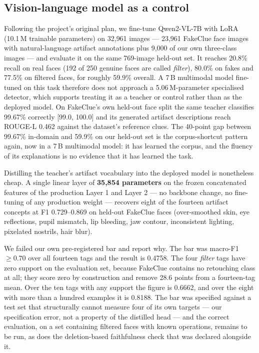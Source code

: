 \documentclass[conference]{IEEEtran}
\begin{document}
\subsection{Vision-language model as a control}
\label{sec:vlm}
Following the project's original plan, we fine-tune Qwen2-VL-7B with LoRA
(10.1\,M trainable parameters) on 32{,}961 images --- 23{,}961 FakeClue face images with
natural-language artifact annotations plus 9{,}000 of our own three-class images --- and
evaluate it on the same 769-image held-out set. It reaches 20.8\% recall on real faces
(192 of 250 genuine faces are called \emph{filter}), 80.0\% on fakes and 77.5\% on filtered
faces, for roughly 59.9\% overall. A 7\,B multimodal model fine-tuned on this task therefore
does not approach a 5.06\,M-parameter specialised detector, which supports treating it as a
teacher or control rather than as the deployed model.
On FakeClue's own held-out face split the same teacher classifies 99.67\% correctly
[99.0, 100.0] and its generated artifact descriptions reach ROUGE-L 0.462 against the
dataset's reference clues. The 40-point gap between 99.67\% in-domain and 59.9\% on our
held-out set is the corpus-shortcut pattern again, now in a 7\,B multimodal model: it has
learned the corpus, and the fluency of its explanations is no evidence that it has learned
the task.

Distilling the teacher's artifact vocabulary into the deployed model is nonetheless cheap.
A single linear layer of \textbf{35{,}854 parameters} on the frozen concatenated features of
the production Layer 1 and Layer 2 --- no backbone change, no fine-tuning of any production
weight --- recovers eight of the fourteen artifact concepts at F1 0.729--0.869 on held-out
FakeClue faces (over-smoothed skin, eye reflections, pupil mismatch, lip bleeding, jaw
contour, inconsistent lighting, pixelated nostrils, hair blur).

We failed our own pre-registered bar and report why. The bar was macro-F1 $\ge 0.70$ over all
fourteen tags and the result is 0.4758. The four \emph{filter} tags have zero support on the
evaluation set, because FakeClue contains no retouching class at all; they score zero by
construction and remove 28.6 points from a fourteen-tag mean. Over the ten tags with any
support the figure is 0.6662, and over the eight with more than a hundred examples it is
0.8188. The bar was specified against a test set that structurally cannot measure four of its
own targets --- our specification error, not a property of the distilled head --- and the
correct evaluation, on a set containing filtered faces with known operations, remains to be
run, as does the deletion-based faithfulness check that was declared alongside it.
\end{document}
